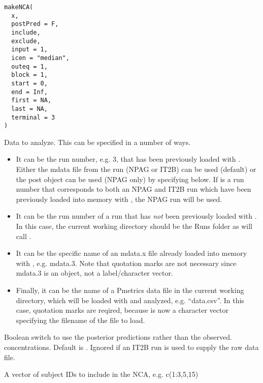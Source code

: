 \documentclass[a4paper]{book}
\begin{document}
%
\begin{Usage}
\begin{verbatim}
makeNCA(
  x,
  postPred = F,
  include,
  exclude,
  input = 1,
  icen = "median",
  outeq = 1,
  block = 1,
  start = 0,
  end = Inf,
  first = NA,
  last = NA,
  terminal = 3
)
\end{verbatim}
\end{Usage}
%
\begin{Arguments}
\begin{ldescription}
\item[\code{x}] Data to analyze.  This can be specified in a number of ways.
\begin{itemize}

\item{} It can be the run number, e.g. 3, that has been previously loaded with .
Either the mdata file from the run (NPAG or IT2B) can be used (default) or
the post object can be used (NPAG only) by specifying  below.  If  is a run number that corresponds 
to both an NPAG and IT2B run which have been previously loaded into memory with , the NPAG run will be used. 
\item{} It can be the run number of a run that has \emph{not} been previously loaded with .
In this case, the current working directory should be the Runs folder as  will call . 
\item{} It can be the specific name of an mdata.x file already loaded into memory with , e.g. mdata.3.  Note
that quotation marks are not necessary since mdata.3 is an object, not a label/character vector.
\item{} Finally, it can be the name of a Pmetrics data file in the current working directory, which will be loaded with
 and analyzed, e.g. ``data.csv''.  In this case, quotation marks are reqired, because 
is now a character vector specifying the filename of the file to load.

\end{itemize}


\item[\code{postPred}] Boolean switch to use the posterior predictions rather than the observed. 
concentrations.  Default is . Ignored if an IT2B run is
used to supply the raw data file.

\item[\code{include}] A vector of subject IDs to include in the NCA, e.g. c(1:3,5,15)


\end{ldescription}
\end{Arguments}
\end{document}
